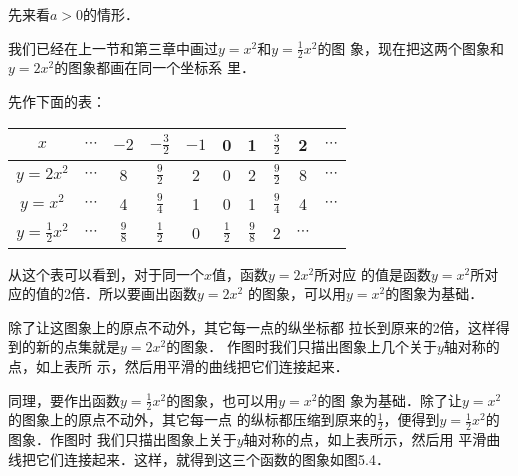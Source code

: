 先来看$a>0$的情形．

我们已经在上一节和第三章中画过$y=x^2$和$y=\frac{1}{2}x^2$的图
象，现在把这两个图象和$y=2x^2$的图象都画在同一个坐标系
里．

先作下面的表：
\begin{center}
\begin{tabular}{c|ccccccccc}
    \hline
$x$ &$\cdots$ & $-2$  & $-\tfrac{3}{2}$  & $-1$   & 0   & 1&$\tfrac{3}{2}$& 2&$\cdots$\\
\hline
$y=2x^2$ &$\cdots$ & 8&$\tfrac{9}{2}$ &2  & 0   & 2&$\tfrac{9}{2}$ &8&$\cdots$\\
$y=x^2$ &$\cdots$ & 4&$\tfrac{9}{4}$&1  & 0   & 1&$\tfrac{9}{4}$&4&$\cdots$\\
$y=\tfrac{1}{2}x^2$ &$\cdots$ & $\tfrac{9}{8}$&$\tfrac{1}{2}$  & 0   & $\tfrac{1}{2}$  & $\tfrac{9}{8}$&2&$\cdots$\\
\hline
\end{tabular}    
\end{center}

\begin{figure}[htp]
    \centering
{}
    \caption{}
\end{figure}

从这个表可以看到，对于同一个$x$值，函数$y=2x^2$所对应
的值是函数$y=x^2$所对应的值的2倍．所以要画出函数$y=2x^2$
的图象，可以用$y=x^2$的图象为基础．

除了让这图象上的原点不动外，其它每一点的纵坐标都
拉长到原来的2倍，这样得到的新的点集就是$y=2x^2$的图象．
作图时我们只描出图象上几个关于$y$轴对称的点，如上表所
示，然后用平滑的曲线把它们连接起来．

同理，要作出函数$y=\frac{1}{2}x^2$的图象，也可以用$y=x^2$的图
象为基础．除了让$y=x^2$的图象上的原点不动外，其它每一点
的纵标都压缩到原来的$\frac{1}{2}$，便得到$y=\frac{1}{2}x^2$的图象．作图时
我们只描出图象上关于$y$轴对称的点，如上表所示，然后用
平滑曲线把它们连接起来．这样，就得到这三个函数的图象如图5.4．

